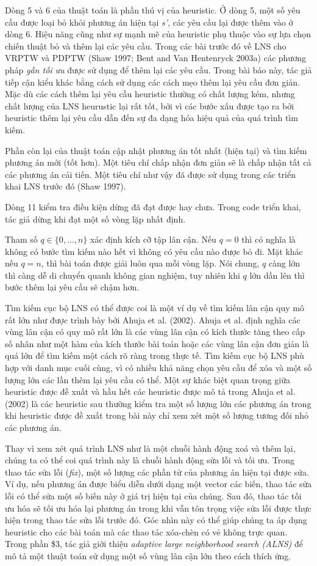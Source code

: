 Dòng 5 và 6 của thuật toán là phần thú vị của heuristic. Ở dòng 5, một số yêu cầu được loại bỏ khỏi phương án hiện tại \textit{s'}, các yêu cầu lại được thêm vào ở dòng 6. Hiệu năng cũng như sự mạnh mẽ của heuristic phụ thuộc vào sự lựa chọn chiến thuật bỏ và thêm lại các yêu cầu. Trong các bài trước đó về LNS cho VRPTW và PDPTW (Shaw 1997; Bent and Van Hentenryck 2003a) các phương pháp \textit{gần tối ưu} được sử dụng để thêm lại các yêu cầu. Trong bài báo này, tác giả tiếp cận kiểu khác bằng cách sử dụng các cách mẹo thêm lại yêu cầu đơn giản. Mặc dù các cách thêm lại yêu cầu heuristic thường có chất lượng kém, nhưng chất lượng của LNS heurustic lại rất tốt, bởi vì các bước xấu được tạo ra bởi heuristic thêm lại yêu cầu dẫn đến sự đa dạng hóa hiệu quả của quá trình tìm kiếm. 

Phần còn lại của thuật toán cập nhật phương án tốt nhất (hiện tại) và tìm kiếm phương án mới (tốt hơn). Một tiêu chí chấp nhận đơn giản sẽ là chấp nhận tất cả các phương án cải tiến. Một tiêu chí như vậy đã được sử dụng trong các triển khai LNS trước đó (Shaw 1997).

Dòng 11 kiểm tra điều kiện dừng đã đạt được hay chưa. Trong code triển khai, tác giả dừng khi đạt một số vòng lặp nhất định.

Tham số $q \in \{0,...,n\}$ xác định kích cỡ tập lân cận. Nếu $q = 0$ thì có nghĩa là không có bước tìm kiếm nào hết vì không có yêu cầu nào được bỏ đi. Mặt khác nếu $q = n$, thì bài toán được giải luôn qua mỗi vòng lặp. Nói chung, $q$
càng lớn thì càng dễ di chuyển quanh không gian nghiệm, tuy nhiên khi $q$ lớn dần lên thì bước thêm lại yêu cầu sẽ chậm hơn. 

Tìm kiếm cục bộ LNS có thể được coi là một ví dụ về tìm kiếm lân cận quy mô rất lớn như được trình bày bởi Ahuja et al. (2002). Ahuja et al. định nghĩa các vùng lân cận có quy mô rất lớn là các vùng lân cận có kích thước tăng theo cấp số nhân như một hàm của kích thước bài toán hoặc các vùng lân cận đơn giản là quá lớn để tìm kiếm một cách rõ ràng trong thực tế. Tìm kiếm cục bộ LNS phù hợp với danh mục cuối cùng, vì có nhiều khả năng chọn yêu cầu để xóa và một số lượng lớn các lần thêm lại yêu cầu có thể. Một sự khác biệt quan trọng giữa heuristic được đề xuất và hầu hết các heuristic được mô tả trong Ahuja et al. (2002) là các heuristic sau thường kiểm tra một số lượng lớn các phương án trong khi heuristic được đề xuất trong bài này chỉ xem xét một số lượng tương đối nhỏ các phương án. 

Thay vì xem xét quá trình LNS như là một chuỗi hành động xoá và thêm lại, chúng ta có thể coi quá trình này là chuỗi hành động sửa lỗi và tối ưu. Trong thao tác sửa lỗi (\textit{fix}), một số lượng các phần tử của phương án hiện tại được sửa. Ví dụ, nếu phương án được biểu diễn dưới dạng một vector các biến, thao tác sửa lỗi có thể sửa một số biến này ở giá trị hiện tại của chúng. Sau đó, thao tác tối ưu hóa sẽ tối ưu hóa lại phương án trong khi vẫn tôn trọng việc sửa lỗi được thực hiện trong thao tác sửa lỗi trước đó. Góc nhìn này có thể giúp chúng ta áp dụng heuristic cho các bài toán mà các thao tác xóa-chèn có vẻ không trực quan. Trong phần \$3, tác giả giới thiệu \textit{adaptive large neighborhood search (ALNS)} để mô tả một thuật toán sử dụng một số vùng lân cận lớn theo cách thích ứng.
